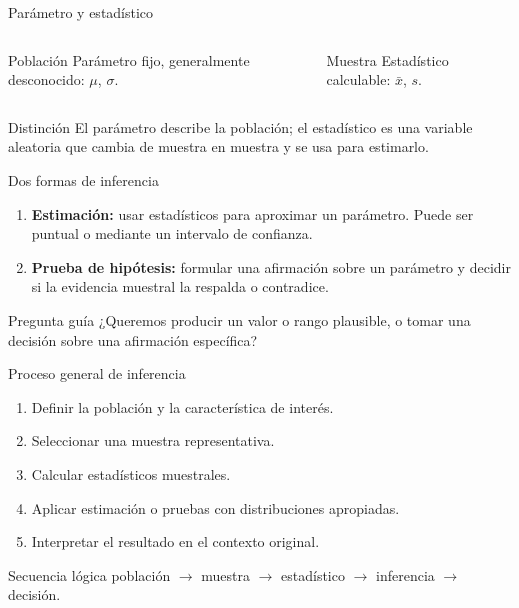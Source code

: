 \documentclass[10pt,aspectratio=169]{beamer}
\begin{document}
\begin{frame}{Parámetro y estadístico}
  \footnotesize
  \begin{columns}[T]
      \begin{block}{Población}
        Parámetro fijo, generalmente desconocido: $\mu$, $\sigma$.
      \end{block}
      \begin{block}{Muestra}
        Estadístico calculable: $\bar{x}$, $s$.
      \end{block}
  \end{columns}
  \vspace{0.15cm}
  \begin{alertblock}{Distinción}
    El parámetro describe la población; el estadístico es una variable aleatoria
    que cambia de muestra en muestra y se usa para estimarlo.
  \end{alertblock}
\end{frame}

\begin{frame}{Dos formas de inferencia}
  \footnotesize
  \begin{enumerate}\itemsep=0.18cm
    \item \textbf{Estimación:} usar estadísticos para aproximar un parámetro.
      Puede ser puntual o mediante un intervalo de confianza.
    \item \textbf{Prueba de hipótesis:} formular una afirmación sobre un
      parámetro y decidir si la evidencia muestral la respalda o contradice.
  \end{enumerate}
  \pause
  \begin{exampleblock}{Pregunta guía}
    ¿Queremos producir un valor o rango plausible, o tomar una decisión sobre
    una afirmación específica?
  \end{exampleblock}
\end{frame}

\begin{frame}{Proceso general de inferencia}
  \footnotesize
  \begin{enumerate}\itemsep=0.12cm
    \item Definir la población y la característica de interés.
    \item Seleccionar una muestra representativa.
    \item Calcular estadísticos muestrales.
    \item Aplicar estimación o pruebas con distribuciones apropiadas.
    \item Interpretar el resultado en el contexto original.
  \end{enumerate}
  \begin{block}{Secuencia lógica}
    \centering población $\longrightarrow$ muestra $\longrightarrow$
    estadístico $\longrightarrow$ inferencia $\longrightarrow$ decisión.
  \end{block}
\end{frame}
\end{document}
